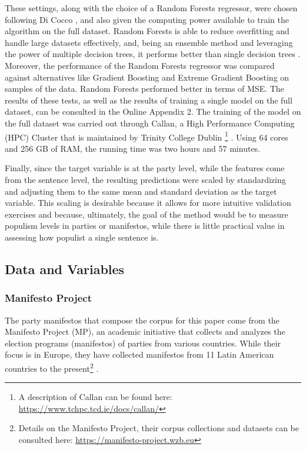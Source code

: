 \documentclass[12pt,letterpaper]{article}
\begin{document}
These settings, along with the choice of a Random Forests regressor, were chosen following Di Cocco\autocite{coccoHowPopulistAre2022} , and also given the computing power available to train the algorithm on the full dataset. Random Forests is able to reduce overfitting and handle large datasets effectively, and, being an ensemble method and leveraging the power of multiple decision trees, it performs better than single decision trees\autocite{breimanRandomForests2001} . Moreover, the performance of the Random Forests regressor was compared against alternatives like Gradient Boosting and Extreme Gradient Boosting on samples of the data. Random Forests performed better in terms of MSE. The  results of these tests, as well as the results of training a single model on the full dataset, can be consulted in the Online Appendix 2. The training of the model on the full dataset was carried out through Callan, a High Performance Computing (HPC) Cluster that is maintained by Trinity College Dublin 
\footnote{A description of Callan can be found here: \textcolor{blue}{\url{https://www.tchpc.tcd.ie/docs/callan/}}} . Using 64 cores and 256 GB of RAM, the running time was two hours and 57 minutes. 

Finally, since the target variable is at the party level, while the features come from the sentence level, the resulting predictions were scaled by standardizing and adjusting them to the same mean and standard deviation as the target variable. This scaling is desirable because it allows for more intuitive validation exercises and because, ultimately, the goal of the method would be to measure populism levels in parties or manifestos, while there is little practical value in assessing how populist a single sentence is. 

\vspace{.25cm}
\subsection{Data and Variables} 

\vspace{.25cm}
\subsubsection{Manifesto Project}

\vspace{.25cm}
\noindent The party manifestos that compose the corpus for this paper come from the Manifesto Project (MP), an academic initiative that collects and analyzes the election programs (manifestos) of parties from various countries. While their focus is in Europe, they have collected manifestos from 11 Latin American countries to the present\footnote{Details on the Manifesto Project, their corpus collections and datasets can be consulted here: 
\textcolor{blue}{\url{https://manifesto-project.wzb.eu}}} . 
\end{document}
